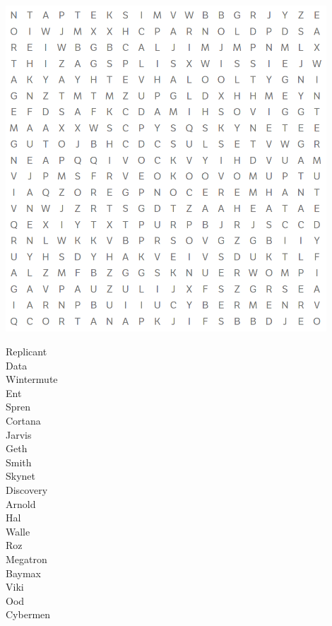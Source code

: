 \vfill

\begin{center}
    \includegraphics[width=0.9\textwidth]{img/word-search.png}  
\end{center}

\vfill
\vfill  

\begin{multicols}{4}
    \begin{large}
        \begin{tabbing}
            Replicant \\
            Data \\
            Wintermute \\
            Ent \\
            Spren \\
            Cortana \\
            Jarvis \\
            Geth \\
            Smith \\
            Skynet \\
            Discovery \\
            Arnold \\
            Hal \\
            Walle \\
            Roz \\
            Megatron \\
            Baymax \\
            Viki \\
            Ood \\
            Cybermen
        \end{tabbing}
    \end{large}
\end{multicols}
